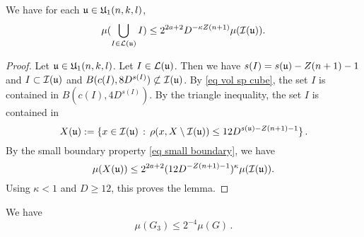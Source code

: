 
\begin{lemma}\label{lulemma}
We have for each $\mathfrak u\in \mathfrak U_1(n,k,l)$,
\begin{equation}
\mu(\bigcup_{I\in \mathcal{L}(\mathfrak u)} I)
\le 2^{2a+2} D^{-\kappa Z(n+1)}
        \mu(\mathcal{I}(\mathfrak{u})).
\end{equation}

\end{lemma}


\begin{proof}
  Let $\mathfrak u\in \mathfrak U_1(n,k,l)$.
Let $I \in \mathcal{L}(\mathfrak u)$. Then we have $s(I) = s(\mathfrak u) - Z(n+1) - 1$ and $I \subset \mathcal{I}(\mathfrak u)$ and $B(c(I), 8D^{s(I)}) \not \subset \mathcal{I}(\mathfrak u)$.
By \eqref{eq vol sp cube}, the set $I$
is contained in $B(c(I), 4D^{s(I)})$.
By the triangle inequality, the set $I$
is contained in
\begin{equation}
    X(\mathfrak u):=\{x \in \mathcal{I}(\mathfrak u) \, : \, \rho(x, X \setminus \mathcal{I}(\mathfrak u)) \leq 12 D^{s(\mathfrak u) - Z(n+1)-1}\}\,.
\end{equation}
 By the small boundary property \eqref{eq small boundary}, we have
   $$
        \mu(X(\mathfrak u)) \le
        2^{2a+2}(12 D^{-Z(n+1)-1})^\kappa
        \mu(\mathcal{I}(\mathfrak{u})).
    $$
Using $\kappa<1$ and $D \ge 12$, this proves the lemma.
\end{proof}














    \begin{lemma}\label{g3bound}

       We have
\begin{equation}
    \mu(G_3)\le 2^{-4} \mu(G)\, .
\end{equation}
    \end{lemma}



